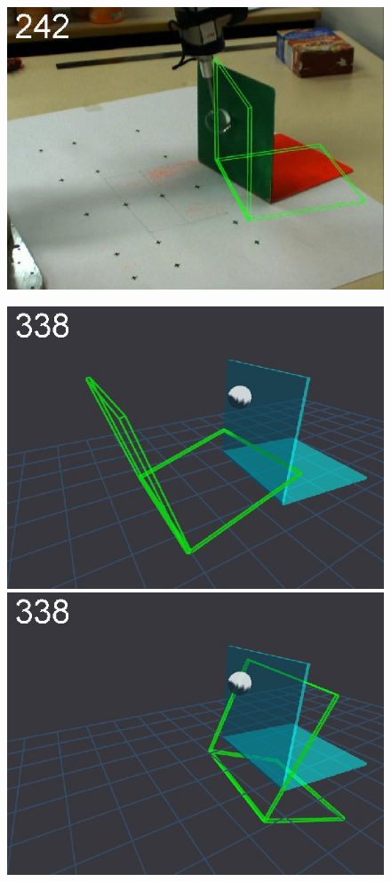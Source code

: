 \begin{figure}[tb]
{\includegraphics[width=\imgBXwid]{./B2_2exp_38_4}
}
\centerline{
\includegraphics[width=\imgBXwid]{./B1_1exp_20_5}
\includegraphics[width=\imgBXwid]{./B1_2exp_20_5}
}
\end{figure}

